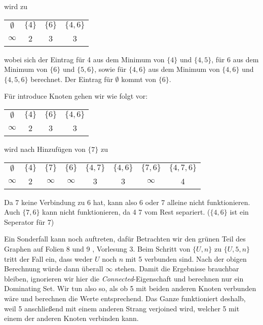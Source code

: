 wird zu

\begin{center}
\begin{tabular}{c c c c}
    $\emptyset$ & $\{4\}$ & $\{6\}$ & $\{4,6\}$\\
    $\infty$ & 2 & 3 & 3\\
\end{tabular}
\end{center}

wobei sich der Eintrag für 4 aus dem Minimum von $\{4\}$ und $\{4,5\}$,
für 6 aus dem Minimum von $\{6\}$ und $\{5,6\}$, sowie für $\{4,6\}$ aus dem Minimum von $\{4,6\}$ und $\{4,5,6\}$ berechnet.
Der Eintrag für $\emptyset$ kommt von $\{6\}$.

Für introduce Knoten gehen wir wie folgt vor:

\begin{center}
\begin{tabular}{c c c c}
    $\emptyset$ & $\{4\}$ & $\{6\}$ & $\{4,6\}$\\
    $\infty$ & 2 & 3 & 3\\
\end{tabular}
\end{center}

wird nach Hinzufügen von $\{7\}$ zu

\begin{center}
\begin{tabular}{c c c c c c c c}
    $\emptyset$ & $\{4\}$ & $\{7\}$ & $\{6\}$ & $\{4,7\}$ &$\{4,6\}$ &$\{7,6\}$ &$\{4,7,6\}$\\
    $\infty$ & 2 & $\infty$ & $\infty$ & 3 & 3 & $\infty$ & 4\\
\end{tabular}
\end{center}

Da 7 keine Verbindung zu 6 hat, kann also 6 oder 7 alleine nicht funktionieren. Auch $\{7,6\}$ kann nicht funktionieren, da 4 7 vom Rest separiert. ($\{4,6\}$ ist ein Seperator für 7)

Ein Sonderfall kann noch auftreten, dafür Betrachten wir den grünen Teil des Graphen auf Folien 8 und 9 , Vorlesung 3.
Beim Schritt von $\{U,n\}$ zu $\{U,5,n\}$ tritt der Fall ein, dass weder $U$ noch $n$ mit 5 verbunden sind. Nach der obigen Berechnung würde dann überall $\infty$ stehen.
Damit die Ergebnisse brauchbar bleiben, ignorieren wir hier die \emph{Connected}-Eigenschaft und berechnen nur ein Dominating Set. Wir tun also so, als ob 5 mit beiden anderen Knoten verbunden wäre und berechnen die Werte entsprechend.
Das Ganze funktioniert deshalb, weil 5 anschließend mit einem anderen Strang verjoined wird, welcher 5 mit einem der anderen Knoten verbinden kann.

